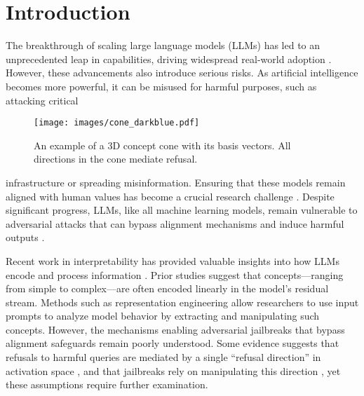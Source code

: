 \section{Introduction}
The breakthrough of scaling large language models (LLMs) has led to an unprecedented leap in capabilities, driving widespread real-world adoption \cite{openai2022chatgpt}. However, these advancements also introduce serious risks.
As artificial intelligence becomes more powerful, it can be misused for harmful purposes, such as attacking critical 
\begin{wrapfigure}[16]{r}{0.5\linewidth}
    \centering
    \texttt{[image: images/cone\_darkblue.pdf]}
    \vspace{-20pt}
    \caption{An example of a 3D concept cone with its basis vectors. All directions in the cone mediate refusal.}
    \label{fig:cone}
\end{wrapfigure}
infrastructure or spreading  misinformation. 
Ensuring that these models remain aligned with human values has become a crucial research challenge \cite{liu2023trustworthy,schwinn2025adversarialalignmentllmsrequires}. Despite significant progress, LLMs, like all machine learning models, remain vulnerable to adversarial attacks that can bypass alignment mechanisms and induce harmful outputs \cite{szegedy2014intriguingpropertiesneuralnetworks, carlini2024alignedneuralnetworksadversarially}.


Recent work in interpretability has provided valuable insights into how LLMs encode and process information \cite{nanda2024Attribution, wang_interpretability_2022, cunningham_sparse_2023, heinzerling2024monotonic}. Prior studies \cite{belrose2023leaceperfectlinearconcept, gurnee2023language, marks2024geometrytruthemergentlinear} suggest that concepts---ranging from simple to complex---are often encoded linearly in the model's residual stream. Methods such as representation engineering \cite{zou_representation_2023} allow researchers to use input prompts to analyze model behavior by extracting and manipulating such concepts. However, the mechanisms enabling adversarial jailbreaks that bypass alignment safeguards remain poorly understood. Some evidence suggests that refusals to harmful queries are mediated by a single “refusal direction” in activation space \cite{arditi2024refusallanguagemodelsmediated}, and that jailbreaks rely on manipulating this direction \cite{yu2024robust}, yet these assumptions require further examination.

